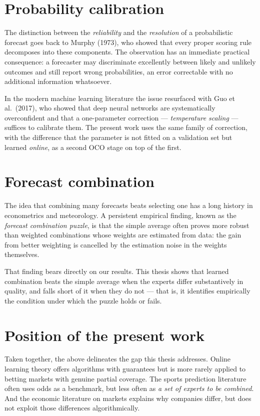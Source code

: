 \documentclass[12pt,a4paper,oneside]{report}
\renewcommand{\_}{\oldunderscore\allowbreak}
\theoremstyle{definition}
\theoremstyle{plain}
\theoremstyle{remark}
\begin{document}
\section{Probability calibration}

The distinction between the \emph{reliability} and the \emph{resolution} of a probabilistic
forecast goes back to Murphy (1973), who showed that every proper scoring rule decomposes into
these components. The observation has an immediate practical consequence: a forecaster may
discriminate excellently between likely and unlikely outcomes and still report wrong
probabilities, an error correctable with no additional information whatsoever.

In the modern machine learning literature the issue resurfaced with Guo et al.\ (2017), who
showed that deep neural networks are systematically overconfident and that a one-parameter
correction --- \emph{temperature scaling} --- suffices to calibrate them. The present work uses
the same family of correction, with the difference that the parameter is not fitted on a
validation set but learned \emph{online}, as a second OCO stage on top of the first.

\section{Forecast combination}

The idea that combining many forecasts beats selecting one has a long history in econometrics
and meteorology. A persistent empirical finding, known as the \emph{forecast combination
puzzle}, is that the simple average often proves more robust than weighted combinations whose
weights are estimated from data: the gain from better weighting is cancelled by the estimation
noise in the weights themselves.

That finding bears directly on our results. This thesis shows that learned combination beats
the simple average when the experts differ substantively in quality, and falls short of it
when they do not --- that is, it identifies empirically the condition under which the puzzle
holds or fails.

\section{Position of the present work}

Taken together, the above delineates the gap this thesis addresses. Online learning theory
offers algorithms with guarantees but is more rarely applied to betting markets with genuine
partial coverage. The sports prediction literature often uses odds as a benchmark, but less
often as \emph{a set of experts to be combined}. And the economic literature on markets
explains why companies differ, but does not exploit those differences algorithmically.
\end{document}
